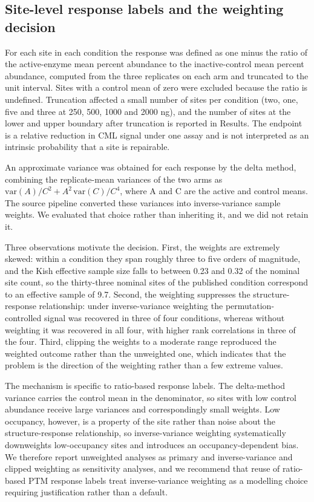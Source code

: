 \documentclass[journal=jprobs,manuscript=article,layout=traditional]{achemso}
\begin{document}
\subsection{Site-level response labels and the weighting decision}

For each site in each condition the response was defined as one minus the ratio of the active-enzyme mean percent abundance to the inactive-control mean percent abundance, computed from the three replicates on each arm and truncated to the unit interval. Sites with a control mean of zero were excluded because the ratio is undefined. Truncation affected a small number of sites per condition (two, one, five and three at 250, 500, 1000 and 2000 ng), and the number of sites at the lower and upper boundary after truncation is reported in Results. The endpoint is a relative reduction in CML signal under one assay and is not interpreted as an intrinsic probability that a site is repairable.

An approximate variance was obtained for each response by the delta method, combining the replicate-mean variances of the two arms as $\mathrm{var}(A)/C^{2} + A^{2}\,\mathrm{var}(C)/C^{4}$, where A and C are the active and control means. The source pipeline converted these variances into inverse-variance sample weights. We evaluated that choice rather than inheriting it, and we did not retain it.

Three observations motivate the decision. First, the weights are extremely skewed: within a condition they span roughly three to five orders of magnitude, and the Kish effective sample size falls to between 0.23 and 0.32 of the nominal site count, so the thirty-three nominal sites of the published condition correspond to an effective sample of 9.7. Second, the weighting suppresses the structure-response relationship: under inverse-variance weighting the permutation-controlled signal was recovered in three of four conditions, whereas without weighting it was recovered in all four, with higher rank correlations in three of the four. Third, clipping the weights to a moderate range reproduced the weighted outcome rather than the unweighted one, which indicates that the problem is the direction of the weighting rather than a few extreme values.

The mechanism is specific to ratio-based response labels. The delta-method variance carries the control mean in the denominator, so sites with low control abundance receive large variances and correspondingly small weights. Low occupancy, however, is a property of the site rather than noise about the structure-response relationship, so inverse-variance weighting systematically downweights low-occupancy sites and introduces an occupancy-dependent bias. We therefore report unweighted analyses as primary and inverse-variance and clipped weighting as sensitivity analyses, and we recommend that reuse of ratio-based PTM response labels treat inverse-variance weighting as a modelling choice requiring justification rather than a default.
\end{document}
